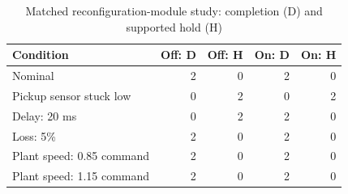 \begin{table}[t]
\caption{Matched reconfiguration-module study: completion (D) and supported hold (H)}
\label{tab:study}
\centering\small
\begin{tabular}{lrrrr}
\toprule
Condition & Off: D & Off: H & On: D & On: H\\
\midrule
Nominal & 2 & 0 & 2 & 0\\
Pickup sensor stuck low & 0 & 2 & 0 & 2\\
Delay: 20 ms & 0 & 2 & 2 & 0\\
Loss: 5\% & 2 & 0 & 2 & 0\\
Plant speed: 0.85 command & 2 & 0 & 2 & 0\\
Plant speed: 1.15 command & 2 & 0 & 2 & 0\\
\bottomrule
\end{tabular}
\end{table}
